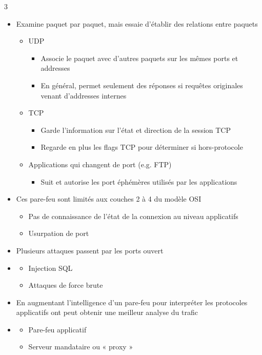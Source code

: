 \documentclass[9pt, a4paper, twoside]{article}
\begin{document}
\begin{multicols}{3}
\begin{itemize}[label=$\bullet$]
    \item \scriptsize Examine paquet par paquet, mais essaie d'établir des relations entre paquets
    \begin{itemize}[label=$\circ$]
        \item \scriptsize UDP
        \begin{itemize}[label={}]
            \item \scriptsize Associe le paquet avec d'autres paquets sur les mêmes ports et addresses
            \item \scriptsize En général, permet seulement des réponses si requêtes originales venant d'addresses internes
        \end{itemize}
        \item \scriptsize TCP
        \begin{itemize}[label={}]
            \item \scriptsize Garde l'information sur l'état et direction de la session TCP
            \item \scriptsize Regarde en plus les flags TCP pour déterminer si hors-protocole
        \end{itemize}
        \item \scriptsize Applications qui changent de port (e.g. FTP)
        \begin{itemize}[label={}]
            \item \scriptsize Suit et autorise les port éphémères utilisés par les applications
        \end{itemize}
    \end{itemize}
    \item \scriptsize Ces pare-feu sont limités aux couches 2 à 4 du modèle OSI
    \begin{itemize}[label=$\circ$]
        \item \scriptsize Pas de connaissance de l'état de la connexion au niveau applicatifs
        \item \scriptsize Usurpation de port
    \end{itemize}
    \item \scriptsize Plusieurs attaques passent par les ports ouvert
    \item \begin{itemize}[label=$\circ$]
        \item \scriptsize Injection SQL
        \item \scriptsize Attaques de force brute
    \end{itemize}
    \item \scriptsize En augmentant l'intelligence d'un pare-feu pour interpréter les protocoles applicatifs ont peut obtenir une meilleur analyse du trafic
    \item \begin{itemize}[label=$\circ$]
        \item \scriptsize Pare-feu applicatif
        \item \scriptsize Serveur mandataire ou « proxy »
    \end{itemize}
\end{itemize}


\end{multicols}
\end{document}
